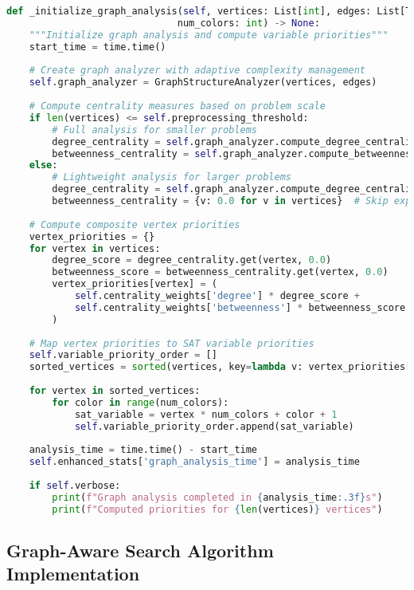 \begin{lstlisting}[language=Python, caption=Centrality-Based Variable Priority System]
def _initialize_graph_analysis(self, vertices: List[int], edges: List[Tuple[int, int]], 
                              num_colors: int) -> None:
    """Initialize graph analysis and compute variable priorities"""
    start_time = time.time()
    
    # Create graph analyzer with adaptive complexity management
    self.graph_analyzer = GraphStructureAnalyzer(vertices, edges)
    
    # Compute centrality measures based on problem scale
    if len(vertices) <= self.preprocessing_threshold:
        # Full analysis for smaller problems
        degree_centrality = self.graph_analyzer.compute_degree_centrality()
        betweenness_centrality = self.graph_analyzer.compute_betweenness_centrality()
    else:
        # Lightweight analysis for larger problems
        degree_centrality = self.graph_analyzer.compute_degree_centrality()
        betweenness_centrality = {v: 0.0 for v in vertices}  # Skip expensive computation
    
    # Compute composite vertex priorities
    vertex_priorities = {}
    for vertex in vertices:
        degree_score = degree_centrality.get(vertex, 0.0)
        betweenness_score = betweenness_centrality.get(vertex, 0.0)
        vertex_priorities[vertex] = (
            self.centrality_weights['degree'] * degree_score + 
            self.centrality_weights['betweenness'] * betweenness_score
        )
    
    # Map vertex priorities to SAT variable priorities
    self.variable_priority_order = []
    sorted_vertices = sorted(vertices, key=lambda v: vertex_priorities[v], reverse=True)
    
    for vertex in sorted_vertices:
        for color in range(num_colors):
            sat_variable = vertex * num_colors + color + 1
            self.variable_priority_order.append(sat_variable)
    
    analysis_time = time.time() - start_time
    self.enhanced_stats['graph_analysis_time'] = analysis_time
    
    if self.verbose:
        print(f"Graph analysis completed in {analysis_time:.3f}s")
        print(f"Computed priorities for {len(vertices)} vertices")
\end{lstlisting}

\subsection{Graph-Aware Search Algorithm Implementation}
\label{appendix:graph-aware-search}

